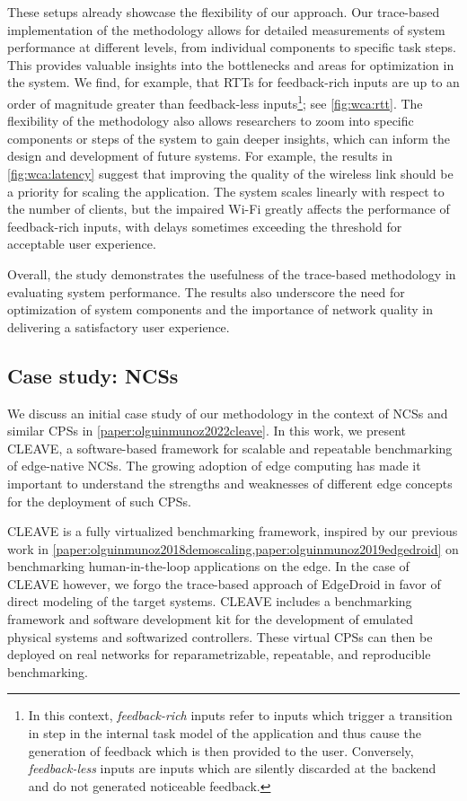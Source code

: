 These setups already showcase the flexibility of our approach.
Our trace-based implementation of the methodology allows for detailed measurements of system performance at different levels, from individual components to specific task steps.
This provides valuable insights into the bottlenecks and areas for optimization in the system.
We find, for example, that \glspl{RTT} for feedback-rich inputs are up to an order of magnitude greater than feedback-less inputs\footnote{%
    In this context, \emph{feedback-rich} inputs refer to inputs which trigger a transition in step in the internal task model of the application and thus cause the generation of feedback which is then provided to the user.
    Conversely, \emph{feedback-less} inputs are inputs which are silently discarded at the backend and do not generated noticeable feedback.
}; see \cref{fig:wca:rtt}.
The flexibility of the methodology also allows researchers to zoom into specific components or steps of the system to gain deeper insights, which can inform the design and development of future systems.
For example, the results in \cref{fig:wca:latency} suggest that improving the quality of the wireless link should be a priority for scaling the application.
The system scales linearly with respect to the number of clients, but the impaired Wi-Fi greatly affects the performance of feedback-rich inputs, with delays sometimes exceeding the threshold for acceptable user experience.

Overall, the study demonstrates the usefulness of the trace-based methodology in evaluating system performance.
The results also underscore the need for optimization of system components and the importance of network quality in delivering a satisfactory user experience.

\subsection{Case study: \acsp{NCS}}\label{summary:methodology:usecase_ncs}

We discuss an initial case study of our methodology in the context of \glspl{NCS} and similar \glspl{CPS} in \cref{paper:olguinmunoz2022cleave}.
In this work, we present \gls{CLEAVE}, a software-based framework for scalable and repeatable benchmarking of edge-native \aclp{NCS}.
The growing adoption of edge computing has made it important to understand the strengths and weaknesses of different edge concepts for the deployment of such \glspl{CPS}.

\gls{CLEAVE} is a fully virtualized benchmarking framework, inspired by our previous work in \cref{paper:olguinmunoz2018demoscaling,paper:olguinmunoz2019edgedroid} on benchmarking human-in-the-loop applications on the edge.
In the case of \gls{CLEAVE} however, we forgo the trace-based approach of EdgeDroid in favor of direct modeling of the target systems.
\gls{CLEAVE} includes a benchmarking framework and software development kit for the development of emulated physical systems and softwarized controllers.
These virtual \glspl{CPS} can then be deployed on real networks for reparametrizable, repeatable, and reproducible benchmarking.

